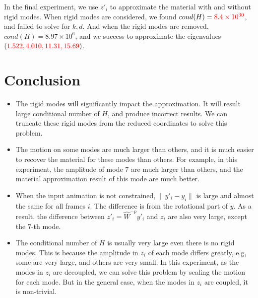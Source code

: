 \documentclass[9pt,twocolumn]{extarticle}
\newcommand{\TODO}[1]{\textcolor{red}{#1}}
\begin{document}
In the final experiment, we use $z'_i$ to approximate the material with and
without rigid modes. When rigid modes are considered, we found
$cond(H)=\TODO{8.4\times 10^{30}}$, and failed to solve for $k,d$. And when the
rigid modes are removed, $cond(H)=8.97\times 10^6$, and we success to
approximate the eigenvalues $(\TODO{1.522,4.010,11.31,15.69})$.

\section{Conclusion}
\begin{itemize}
\item The rigid modes will significantly impact the approximation. It will
  result large conditional number of $H$, and produce incorrect results. We can
  truncate these rigid modes from the reduced coordinates to solve this problem.
\item The motion on some modes are much larger than others, and it is much
  easier to recover the material for these modes than others. For example, in
  this experiment, the amplitude of mode $7$ are much larger than others, and
  the material approximation result of this mode are much better.
\item When the input animation is not constrained, $\|y'_i-y_i\|$ is large and
  almost the same for all frames $i$. The difference is from the rotational part
  of $y$. As a result, the difference between $z'_i=\hat{W}^{-p}y'_i$ and $z_i$
  are also very large, except the $7$-th mode.
\item The conditional number of $H$ is usually very large even there is no rigid
  modes. This is because the amplitude in $z_i$ of each mode differs greatly,
  e.g, some are very large, and others are very small. In this experiment, as
  the modes in $z_i$ are decoupled, we can solve this problem by scaling the
  motion for each mode. But in the general case, when the modes in $z_i$ are
  coupled, it is non-trivial.
\end{itemize}
\end{document}
